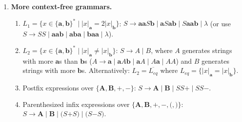 \begin{enumerate}[{8.}1. ]
\begin{enumerate}
\item $L = \{x \in \{\pmb{a},\pmb{b}\}^* \mid |x|_{\pmb{a}} < |x|_{\pmb{b}}\}$:
\[
G: S \to \pmb{b} \mid BS \mid SB \mid BSB, \quad B \to \pmb{b} \mid \pmb{a}B\pmb{a} \mid \pmb{b}B\pmb{b}
\]
More carefully: Use the grammar for balanced strings plus extra $\pmb{b}$s. A cleaner version:
$S \to SS \mid \pmb{b}S\pmb{a} \mid S\pmb{b}\pmb{a} \mid \pmb{b}$.

\item $G = \{x \in \{\pmb{a},\pmb{b}\}^* \mid |x|_{\pmb{a}} \geq |x|_{\pmb{b}}\}$:
$S \to SS \mid \pmb{a} \mid \pmb{a}S\pmb{b} \mid \pmb{a}S \mid \lambda$.

\item $K = \{w \in \{\pmb{0},\pmb{1}\}^* \mid w = w^r\}$ (palindromes):
$S \to \pmb{0}S\pmb{0} \mid \pmb{1}S\pmb{1} \mid \pmb{0} \mid \pmb{1} \mid \lambda$.

\item $\Phi = \{\pmb{a}^j\pmb{b}^k\pmb{c}^m \mid j\geq 3, k=m\}$:
$S \to \pmb{aaa}AT$, $A \to \pmb{a}A \mid \lambda$, $T \to \pmb{b}T\pmb{c} \mid \lambda$.
\end{enumerate}

\item \textbf{More context-free grammars.}

\begin{enumerate}
\item $L_1 = \{x \in \{\pmb{a},\pmb{b}\}^* \mid |x|_{\pmb{a}} = 2|x|_{\pmb{b}}\}$:
$S \to \pmb{a}\pmb{a}S\pmb{b} \mid \pmb{a}S\pmb{a}\pmb{b} \mid S\pmb{a}\pmb{a}\pmb{b} \mid \lambda$ (or use $S \to SS \mid \pmb{aab} \mid \pmb{aba} \mid \pmb{baa} \mid \lambda$).

\item $L_2 = \{x \in \{\pmb{a},\pmb{b}\}^* \mid |x|_{\pmb{a}} \neq |x|_{\pmb{b}}\}$:
$S \to A \mid B$, where $A$ generates strings with more $\pmb{a}$s than $\pmb{b}$s ($A \to \pmb{a} \mid \pmb{a}A\pmb{b} \mid \pmb{a}A \mid A\pmb{a} \mid AA$) and $B$ generates strings with more $\pmb{b}$s. Alternatively: $L_2 = \overline{L_{eq}}$ where $L_{eq} = \{|x|_{\pmb{a}}=|x|_{\pmb{b}}\}$.

\item Postfix expressions over $\{\pmb{A},\pmb{B},\pmb{+},\pmb{-}\}$:
$S \to \pmb{A} \mid \pmb{B} \mid SS\pmb{+} \mid SS\pmb{-}$.

\item Parenthesized infix expressions over $\{\pmb{A},\pmb{B},\pmb{+},\pmb{-},\pmb{(},\pmb{)}\}$:
$S \to \pmb{A} \mid \pmb{B} \mid \pmb{(}S\pmb{+}S\pmb{)} \mid \pmb{(}S\pmb{-}S\pmb{)}$.
\end{enumerate}


\end{enumerate}
